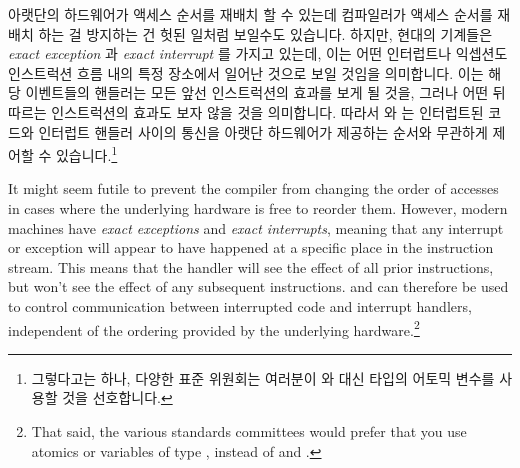 
\fi

아랫단의 하드웨어가 액세스 순서를 재배치 할 수 있는데 컴파일러가 액세스 순서를
재배치 하는 걸 방지하는 건 헛된 일처럼 보일수도 있습니다.
하지만, 현대의 기계들은 \emph{exact exception} 과 \emph{exact interrupt} 를
가지고 있는데, 이는 어떤 인터럽트나 익셉션도 인스트럭션 흐름 내의 특정 장소에서
일어난 것으로 보일 것임을 의미합니다.
이는 해당 이벤트들의 핸들러는 모든 앞선 인스트럭션의 효과를 보게 될 것을,
그러나 어떤 뒤따르는 인스트럭션의 효과도 보자 않을 것을 의미합니다.
따라서  와  는 인터럽트된 코드와 인터럽트
핸들러 사이의 통신을 아랫단 하드웨어가 제공하는 순서와 무관하게 제어할 수
있습니다.\footnote{
	그렇다고는 하나, 다양한 표준 위원회는 여러분이  와
	 대신  타입의 어토믹 변수를
	사용할 것을 선호합니다.}

\iffalse

It might seem futile to prevent the compiler from changing the order of
accesses in cases where the underlying hardware is free to reorder them.
However, modern machines have \emph{exact exceptions} and
\emph{exact interrupts}, meaning that any interrupt or exception will
appear to have happened at a specific place in the instruction
stream.
This means that the handler will see the effect of all prior
instructions, but won't see the effect of any subsequent instructions.
 and  can therefore be used to
control communication between interrupted code and interrupt handlers,
independent of the ordering provided by the underlying hardware.\footnote{
	That said, the various standards committees would prefer that
	you use atomics or variables of type , instead
	of  and .}

